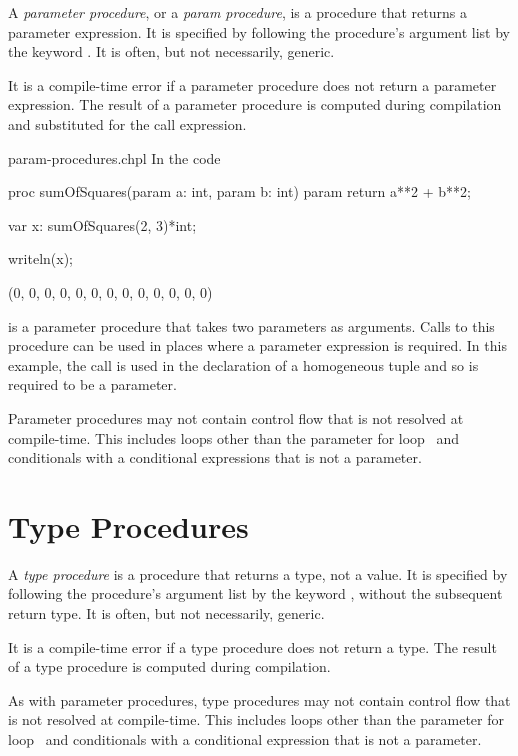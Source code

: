 A \emph{parameter procedure}, or a \emph{param procedure}, is a procedure that returns a parameter
expression.  It is specified by following the procedure's argument list
by the keyword .  It is often, but not necessarily,
generic.

It is a compile-time error if a parameter procedure does not return a
parameter expression.  The result of a parameter procedure is computed
during compilation and substituted for the call expression.

\begin{chapelexample}{param-procedures.chpl}
In the code
\begin{chapel}
proc sumOfSquares(param a: int, param b: int) param
  return a**2 + b**2;

var x: sumOfSquares(2, 3)*int;
\end{chapel}
\begin{chapelpost}
writeln(x);
\end{chapelpost}
\begin{chapeloutput}
(0, 0, 0, 0, 0, 0, 0, 0, 0, 0, 0, 0, 0)
\end{chapeloutput}
 is a parameter procedure that takes
two parameters as arguments.  Calls to this procedure can be used in
places where a parameter expression is required.  In this example, the
call is used in the declaration of a homogeneous tuple and so is
required to be a parameter.
\end{chapelexample}

Parameter procedures may not contain control flow that is not resolved
at compile-time.  This includes loops other than the parameter for
loop~ and conditionals with a conditional
expressions that is not a parameter.


\section{Type Procedures}
\label{Type_Procedures}

A \emph{type procedure} is a procedure that returns a type, not a value.  It is specified by
following the procedure's argument list by the keyword , without the subsequent return type.  It
is often, but not necessarily, generic.

It is a compile-time error if a type procedure does not return a type.
The result of a type procedure is computed during compilation.

As with parameter procedures, type procedures may not contain control
flow that is not resolved at compile-time.  This includes loops other
than the parameter for loop~ and
conditionals with a conditional expression that is not a parameter.

